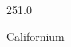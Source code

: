 \documentclass[12pt]{article}
\begin{document}
\hfill{}
\vfill
\begin{center}
  {\fontsize{50}{60}
  }

  \vspace{1em}

  251.0

Californium
\end{center}
\vfill
\end{document}
